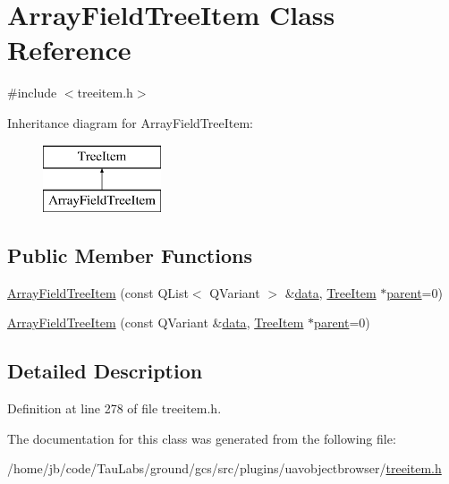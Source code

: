 \hypertarget{class_array_field_tree_item}{\section{\-Array\-Field\-Tree\-Item \-Class \-Reference}
\label{class_array_field_tree_item}
}


{\ttfamily \#include $<$treeitem.\-h$>$}

\-Inheritance diagram for \-Array\-Field\-Tree\-Item\-:\begin{figure}[H]
\begin{center}
\leavevmode
\includegraphics[height=2.000000cm]{class_array_field_tree_item}
\end{center}
\end{figure}
\subsection*{\-Public \-Member \-Functions}
\begin{DoxyCompactItemize}
\item 
\hyperlink{group___u_a_v_object_browser_plugin_gac1bacf7300e5dcaad4bb7da856408a99}{\-Array\-Field\-Tree\-Item} (const \-Q\-List$<$ \-Q\-Variant $>$ \&\hyperlink{group___u_a_v_object_browser_plugin_ga7c5708ae3cbba9c509f497c493beccb6}{data}, \hyperlink{class_tree_item}{\-Tree\-Item} $\ast$\hyperlink{group___u_a_v_object_browser_plugin_gaa3a7ba624312b6be70872634db291881}{parent}=0)
\item 
\hyperlink{group___u_a_v_object_browser_plugin_gaa011115b44f5875931af40aa93a80e97}{\-Array\-Field\-Tree\-Item} (const \-Q\-Variant \&\hyperlink{group___u_a_v_object_browser_plugin_ga7c5708ae3cbba9c509f497c493beccb6}{data}, \hyperlink{class_tree_item}{\-Tree\-Item} $\ast$\hyperlink{group___u_a_v_object_browser_plugin_gaa3a7ba624312b6be70872634db291881}{parent}=0)
\end{DoxyCompactItemize}


\subsection{\-Detailed \-Description}


\-Definition at line 278 of file treeitem.\-h.



\-The documentation for this class was generated from the following file\-:\begin{DoxyCompactItemize}
\item 
/home/jb/code/\-Tau\-Labs/ground/gcs/src/plugins/uavobjectbrowser/\hyperlink{treeitem_8h}{treeitem.\-h}\end{DoxyCompactItemize}
